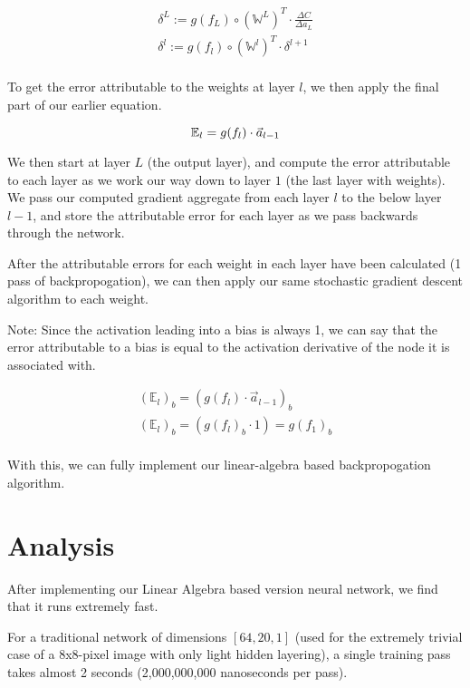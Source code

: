 \documentclass[8pt]{amsart}
\newcommand\mat[1]{\mathbb{#1}}
\begin{document}
\[
    \begin{aligned}
        \delta^L := g(f_L) \circ (\mat{W}^L)^T \cdot \frac{ \Delta C }{ \Delta a_L } \\
        \delta^l := g(f_l) \circ (\mat{W}^{l})^T \cdot \delta^{l + 1} \\
    \end{aligned}
\]

To get the error attributable to the weights at layer $l$, we then apply the final part
of our earlier equation.

\[
    \mat{E}_l = g(f_l) \cdot \vec{a}_{l - 1} \\
\]

We then start at layer $L$ (the output layer), and compute the error attributable to
each layer as we work our way down to layer $1$ (the last layer with weights). We pass
our computed gradient aggregate from each layer $l$ to the below layer $l - 1$, and store
the attributable error for each layer as we pass backwards through the network.

After the attributable errors for each weight in each layer have been calculated (1 pass
of backpropogation), we can then apply our same stochastic gradient descent algorithm to
each weight.

Note: Since the activation leading into a bias is always 1, we can say that the error
attributable to a bias is equal to the activation derivative of the node it is associated
with.

\[
    \begin{aligned}
        (\mat{E}_l)_b = (g(f_l) \cdot \vec{a}_{l - 1})_{b} \\
        (\mat{E}_l)_b = (g(f_l)_{b} \cdot 1) = g(f_1)_b \\
    \end{aligned}
\]

With this, we can fully implement our linear-algebra based backpropogation algorithm.

\section{Analysis}

After implementing our Linear Algebra based version neural network, we find that
it runs extremely fast.

For a traditional network of dimensions $[64, 20, 1]$ (used for the extremely
trivial case of a 8x8-pixel image with only light hidden layering), a single training
pass takes almost 2 seconds (2,000,000,000 nanoseconds per pass).
\end{document}
